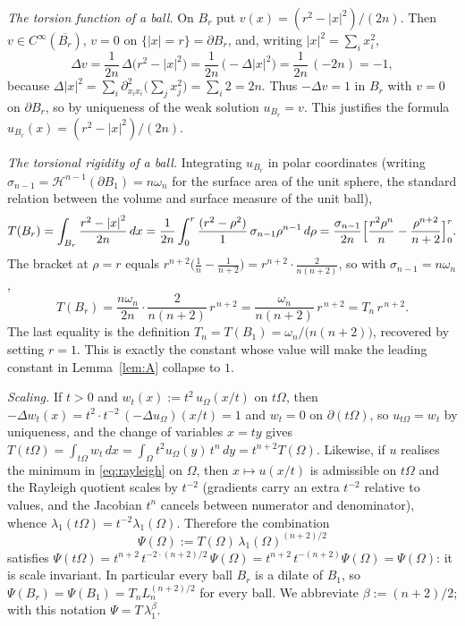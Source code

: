 \documentclass[11pt]{amsart}
\theoremstyle{definition}
\newcommand{\Om}{\Omega}
\newcommand{\abs}[1]{\left|#1\right|}
\newcommand{\dx}{\,dx}
\begin{document}
\emph{The torsion function of a ball.} On $B_r$ put
$v(x)=(r^2-\abs x^2)/(2n)$. Then $v\in C^\infty(\overline{B_r})$, $v=0$ on
$\{\abs x=r\}=\partial B_r$, and, writing $\abs x^2=\sum_{i}x_i^2$,
\[
  \Delta v=\frac{1}{2n}\,\Delta\bigl(r^2-\abs x^2\bigr)
  =\frac{1}{2n}\,\bigl(-\Delta\abs x^2\bigr)
  =\frac{1}{2n}\,(-2n)=-1,
\]
because $\Delta\abs x^2=\sum_i\partial_{x_ix_i}^2\bigl(\sum_j x_j^2\bigr)
=\sum_i 2=2n$. Thus $-\Delta v=1$ in $B_r$ with $v=0$ on $\partial B_r$, so
by uniqueness of the weak solution $u_{B_r}=v$. This justifies the formula
$u_{B_r}(x)=(r^2-\abs x^2)/(2n)$.

\emph{The torsional rigidity of a ball.} Integrating $u_{B_r}$ in polar
coordinates (writing $\sigma_{n-1}=\mathcal H^{n-1}(\partial B_1)=n\omega_n$
for the surface area of the unit sphere, the standard relation between the
volume and surface measure of the unit ball),
\[
  T(B_r)=\int_{B_r}\frac{r^2-\abs x^2}{2n}\dx
  =\frac{1}{2n}\int_0^r\frac{(r^2-\rho^2)}{1}\,\sigma_{n-1}\rho^{n-1}\,d\rho
  =\frac{\sigma_{n-1}}{2n}\Bigl[\frac{r^2\rho^n}{n}-\frac{\rho^{n+2}}{n+2}
     \Bigr]_0^r .
\]
The bracket at $\rho=r$ equals
$r^{n+2}\bigl(\tfrac1n-\tfrac1{n+2}\bigr)
=r^{n+2}\cdot\tfrac{2}{n(n+2)}$, so with $\sigma_{n-1}=n\omega_n$,
\begin{equation}\label{eq:torsionball}
  T(B_r)=\frac{n\omega_n}{2n}\cdot\frac{2}{n(n+2)}\,r^{\,n+2}
  =\frac{\omega_n}{n(n+2)}\,r^{\,n+2}=T_n\,r^{\,n+2}.
\end{equation}
The last equality is the definition $T_n=T(B_1)=\omega_n/\bigl(n(n+2)\bigr)$,
recovered by setting $r=1$. This is exactly the constant whose value will
make the leading constant in Lemma~\ref{lem:A} collapse to $1$.

\emph{Scaling.} If $t>0$ and $w_t(x):=t^2\,u_\Om(x/t)$ on $t\Om$, then
$-\Delta w_t(x)=t^2\cdot t^{-2}\,(-\Delta u_\Om)(x/t)=1$ and $w_t=0$ on
$\partial(t\Om)$, so $u_{t\Om}=w_t$ by uniqueness, and the change of
variables $x=ty$ gives
$T(t\Om)=\int_{t\Om}w_t\dx=\int_\Om t^2u_\Om(y)\,t^n\,dy=t^{n+2}T(\Om)$.
Likewise, if $u$ realises the minimum in \eqref{eq:rayleigh} on $\Om$, then
$x\mapsto u(x/t)$ is admissible on $t\Om$ and the Rayleigh quotient scales
by $t^{-2}$ (gradients carry an extra $t^{-2}$ relative to values, and the
Jacobian $t^n$ cancels between numerator and denominator), whence
$\lambda_1(t\Om)=t^{-2}\lambda_1(\Om)$. Therefore the combination
\begin{equation}\label{eq:psi-def}
  \Psi(\Om):=T(\Om)\,\lambda_1(\Om)^{(n+2)/2}
\end{equation}
satisfies $\Psi(t\Om)=t^{n+2}\,t^{-2\cdot(n+2)/2}\,\Psi(\Om)
=t^{n+2}\,t^{-(n+2)}\Psi(\Om)=\Psi(\Om)$: it is scale invariant. In
particular every ball $B_r$ is a dilate of $B_1$, so
$\Psi(B_r)=\Psi(B_1)=T_n L_n^{(n+2)/2}$ for every ball. We abbreviate
$\beta:=(n+2)/2$; with this notation $\Psi=T\,\lambda_1^{\beta}$.
\end{document}
